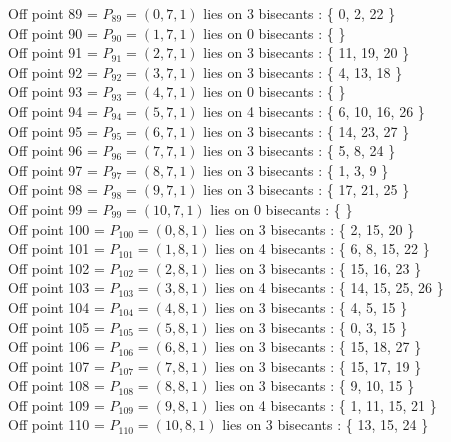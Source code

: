 \documentclass{article}
\begin{document}
{Off point 89 = $P_{89} = ( 0, 7, 1 )$ lies on 3 bisecants : \{ 0, 2, 22 \}\\
Off point 90 = $P_{90} = ( 1, 7, 1 )$ lies on 0 bisecants : \{  \}\\
Off point 91 = $P_{91} = ( 2, 7, 1 )$ lies on 3 bisecants : \{ 11, 19, 20 \}\\
Off point 92 = $P_{92} = ( 3, 7, 1 )$ lies on 3 bisecants : \{ 4, 13, 18 \}\\
Off point 93 = $P_{93} = ( 4, 7, 1 )$ lies on 0 bisecants : \{  \}\\
Off point 94 = $P_{94} = ( 5, 7, 1 )$ lies on 4 bisecants : \{ 6, 10, 16, 26 \}\\
Off point 95 = $P_{95} = ( 6, 7, 1 )$ lies on 3 bisecants : \{ 14, 23, 27 \}\\
Off point 96 = $P_{96} = ( 7, 7, 1 )$ lies on 3 bisecants : \{ 5, 8, 24 \}\\
Off point 97 = $P_{97} = ( 8, 7, 1 )$ lies on 3 bisecants : \{ 1, 3, 9 \}\\
Off point 98 = $P_{98} = ( 9, 7, 1 )$ lies on 3 bisecants : \{ 17, 21, 25 \}\\
Off point 99 = $P_{99} = ( 10, 7, 1 )$ lies on 0 bisecants : \{  \}\\
Off point 100 = $P_{100} = ( 0, 8, 1 )$ lies on 3 bisecants : \{ 2, 15, 20 \}\\
Off point 101 = $P_{101} = ( 1, 8, 1 )$ lies on 4 bisecants : \{ 6, 8, 15, 22 \}\\
Off point 102 = $P_{102} = ( 2, 8, 1 )$ lies on 3 bisecants : \{ 15, 16, 23 \}\\
Off point 103 = $P_{103} = ( 3, 8, 1 )$ lies on 4 bisecants : \{ 14, 15, 25, 26 \}\\
Off point 104 = $P_{104} = ( 4, 8, 1 )$ lies on 3 bisecants : \{ 4, 5, 15 \}\\
Off point 105 = $P_{105} = ( 5, 8, 1 )$ lies on 3 bisecants : \{ 0, 3, 15 \}\\
Off point 106 = $P_{106} = ( 6, 8, 1 )$ lies on 3 bisecants : \{ 15, 18, 27 \}\\
Off point 107 = $P_{107} = ( 7, 8, 1 )$ lies on 3 bisecants : \{ 15, 17, 19 \}\\
Off point 108 = $P_{108} = ( 8, 8, 1 )$ lies on 3 bisecants : \{ 9, 10, 15 \}\\
Off point 109 = $P_{109} = ( 9, 8, 1 )$ lies on 4 bisecants : \{ 1, 11, 15, 21 \}\\
Off point 110 = $P_{110} = ( 10, 8, 1 )$ lies on 3 bisecants : \{ 13, 15, 24 \}\\
}
\end{document}
